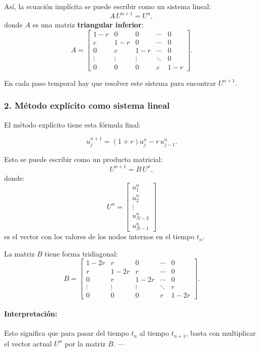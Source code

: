 \documentclass[12pt,a4paper]{article}
\begin{document}
Así, la ecuación implícita se puede escribir como un sistema lineal:
\[
A\,U^{n+1} = U^n,
\]
donde \(A\) es una matriz \textbf{triangular inferior}:
\[
A =
\begin{bmatrix}
1-r & 0   & 0   & \cdots & 0 \\[4pt]
c   & 1-r & 0   & \cdots & 0 \\[4pt]
0   & c   & 1-r & \cdots & 0 \\[4pt]
\vdots & \vdots & \vdots & \ddots & 0 \\[4pt]
0   & 0   & 0   & c      & 1-r
\end{bmatrix}.
\]

En cada paso temporal hay que resolver este sistema para encontrar \(U^{n+1}\).  
\subsubsection*{2. Método explícito como sistema lineal}

El método explícito tiene esta fórmula final:

\[
u_j^{n+1} = (1+r)u_j^n - r\,u_{j-1}^n.
\]

Esto se puede escribir como un producto matricial:
\[
U^{n+1} = B\,U^n,
\]
donde:
\[
U^n = 
\begin{bmatrix}
u_1^n \\ u_2^n \\ \vdots \\ u_{N-2}^n \\ u_{N-1}^n
\end{bmatrix}
\]
es el vector con los valores de los nodos internos en el tiempo \(t_n\).

La matriz \(B\) tiene forma tridiagonal:
\[
B = 
\begin{bmatrix}
1-2r & r     & 0     & \cdots & 0 \\[4pt]
r     & 1-2r & r     & \cdots & 0 \\[4pt]
0     & r     & 1-2r & \cdots & 0 \\[4pt]
\vdots& \vdots& \vdots& \ddots & r \\[4pt]
0     & 0     & 0     & r      & 1-2r
\end{bmatrix}.
\]

\paragraph{Interpretación:}  
Esto significa que para pasar del tiempo \(t_n\) al tiempo \(t_{n+1}\), basta con multiplicar el vector actual \(U^n\) por la matriz \(B\).  
---
\end{document}
